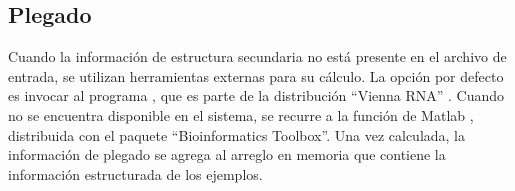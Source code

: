 %
\subsection{Plegado}
%
Cuando la información de estructura secundaria no está presente en el
archivo de entrada, se utilizan herramientas externas para su cálculo.
La opción por defecto es invocar al programa , que es
parte de la distribución ``Vienna RNA'' \cite{vienna}.
Cuando  no se encuentra disponible en el sistema, se
recurre a la función de Matlab , distribuida con el
paquete ``Bioinformatics Toolbox''.
Una vez calculada, la información de plegado se agrega al arreglo en
memoria que contiene la información estructurada de los ejemplos.

